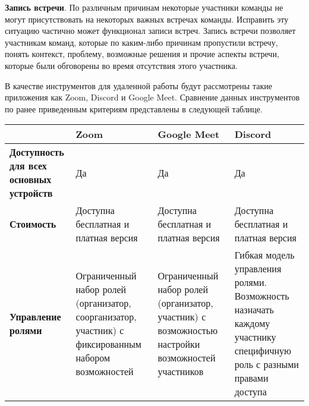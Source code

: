 \documentclass[a4paper, 14pt]{extarticle}
\begin{document}
\textbf{Запись встречи}. По различным причинам некоторые участники команды не
могут присутствовать на некоторых важных встречах команды. Исправить эту
ситуацию частично может функционал записи встреч. Запись встречи позволяет
участникам команд, которые по каким-либо причинам пропустили встречу, понять
контекст, проблему, возможные решения и прочие аспекты встречи, которые были
обговорены во время отсутствия этого участника.

В качестве инструментов для удаленной работы будут рассмотрены такие приложения
как Zoom, Discord и Google Meet. Сравнение данных инструментов по ранее
приведенным критериям представлены в следующей таблице.

{
\renewcommand*{\arraystretch}{1.5}
\begin{longtable}{|C{0.28\textwidth}|C{0.21\textwidth}|C{0.21\textwidth}|C{0.21\textwidth}|}
  \hline
   & \textbf{Zoom}                                                                                        & \textbf{Google Meet}                                                                              & \textbf{Discord}                                                                                                    \\
  \hline
  \textbf{Доступность для всех основных устройств}                      & Да                                                                                                   & Да                                                                                                & Да                                                                                                                  \\
  \hline
  \textbf{Стоимость}                                                    & Доступна бесплатная и платная версия                                                                 & Доступна бесплатная и платная версия                                                              & Доступна бесплатная и платная версия                                                                                \\
  \hline
  \textbf{Управление ролями}                                            & Ограниченный набор ролей (организатор, соорганизатор, участник) с фиксированным набором возможностей & Ограниченный набор ролей (организатор, участник) с возможностью настройки возможностей участников & Гибкая модель управления ролями. Возможность назначать каждому участнику специфичную роль с разными правами доступа \\

\end{longtable}}
\end{document}

